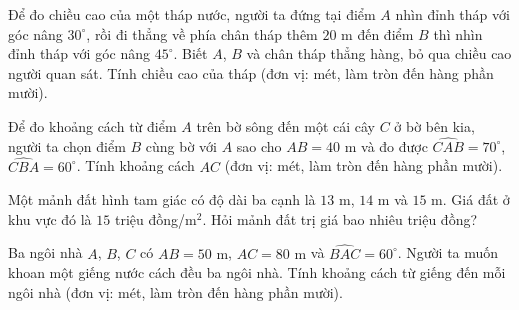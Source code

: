 \begin{bt}%
	Để đo chiều cao của một tháp nước, người ta đứng tại điểm $A$ nhìn đỉnh tháp với góc nâng $30^\circ$, rồi đi thẳng về phía chân tháp thêm $20\text{ m}$ đến điểm $B$ thì nhìn đỉnh tháp với góc nâng $45^\circ$. Biết $A$, $B$ và chân tháp thẳng hàng, bỏ qua chiều cao người quan sát. Tính chiều cao của tháp (đơn vị: mét, làm tròn đến hàng phần mười).
\end{bt}

\begin{bt}%
	Để đo khoảng cách từ điểm $A$ trên bờ sông đến một cái cây $C$ ở bờ bên kia, người ta chọn điểm $B$ cùng bờ với $A$ sao cho $AB=40\text{ m}$ và đo được $\widehat{CAB}=70^\circ$, $\widehat{CBA}=60^\circ$. Tính khoảng cách $AC$ (đơn vị: mét, làm tròn đến hàng phần mười).
\end{bt}

\begin{bt}%
	Một mảnh đất hình tam giác có độ dài ba cạnh là $13\text{ m}$, $14\text{ m}$ và $15\text{ m}$. Giá đất ở khu vực đó là $15$ triệu đồng/m$^2$. Hỏi mảnh đất trị giá bao nhiêu triệu đồng?
\end{bt}

\begin{bt}%
	Ba ngôi nhà $A$, $B$, $C$ có $AB=50\text{ m}$, $AC=80\text{ m}$ và $\widehat{BAC}=60^\circ$. Người ta muốn khoan một giếng nước cách đều ba ngôi nhà. Tính khoảng cách từ giếng đến mỗi ngôi nhà (đơn vị: mét, làm tròn đến hàng phần mười).
\end{bt}

